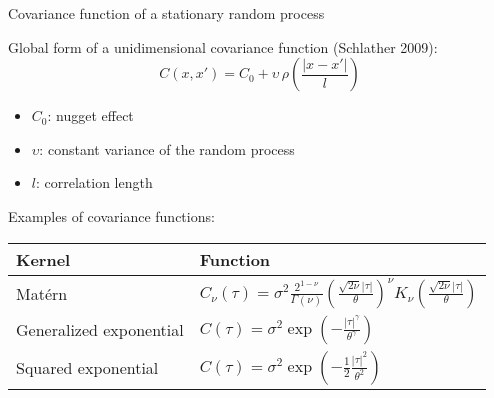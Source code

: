 \documentclass[9pt]{beamer}
\newcommand{\absolute}[1]{| #1 |}
\begin{document}
\begin{frame}[t]{Covariance function of a stationary random process}

Global form of a unidimensional covariance function (Schlather 2009):
\[
C(x, x') = C_0 + \upsilon \, \rho \left( \frac{\absolute{x-x'}}{l} \right)
\]

\begin{itemize}
\item $C_0$: nugget effect
\item $\upsilon$: constant variance of the random process
\item $l$: correlation length
\end{itemize}

Examples of covariance functions: 
\begin{center}
\begin{tabular}{ll}
  \hline
  Kernel & Function \\
  \hline
  Mat\'{e}rn &  $C_{\nu}(\tau)  = \sigma^2 \frac{2^{1-\nu}}{\Gamma(\nu)}
 \left( \frac{\sqrt{2\nu} \absolute{\tau}}{\theta} \right)^\nu
 K_\nu \left( \frac{\sqrt{2\nu} \absolute{\tau}}{\theta} \right)$ \\
  Generalized exponential &   $C(\tau)  = \sigma^2 \exp \left( -\frac{\absolute{\tau}^\gamma}{\theta^\gamma} \right)$\\
  Squared exponential &  $C(\tau)  = \sigma^2 \exp \left( -\frac{1}{2} \frac{\absolute{\tau}^2}{\theta^2} \right)$ \\
  \hline
\end{tabular}
\end{center}

\end{frame}
\end{document}
